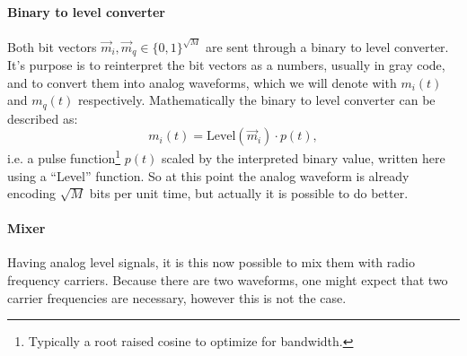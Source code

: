 \paragraph{Binary to level converter}


Both bit vectors \(\vec{m}_i, \vec{m}_q \in \{0,1\}^{\sqrt{M}}\) are sent through a binary to level converter. It's purpose is to reinterpret the bit vectors as a numbers, usually in gray code, and to convert them into analog waveforms, which we will denote with \(m_i(t)\) and \(m_q(t)\) respectively. Mathematically the binary to level converter can be described as:
\begin{equation}
	m_i(t) = \text{Level}(\vec{m}_i) \cdot p(t),
\end{equation}
i.e. a pulse function\footnote{Typically a root raised cosine to optimize for bandwidth.} \(p(t)\) scaled by the interpreted binary value, written here using a ``Level'' function. So at this point the analog waveform is already encoding \(\sqrt{M}\) bits per unit time, but actually it is possible to do better.

\paragraph{Mixer}

Having analog level signals, it is this now possible to mix them with radio frequency carriers. Because there are two waveforms, one might expect that two carrier frequencies are necessary, however this is not the case.

